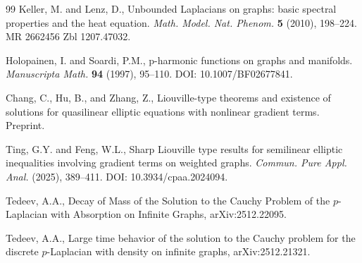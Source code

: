 \documentclass{article}
\begin{document}
\begin{thebibliography}{99}
		 Keller, M. and Lenz, D., Unbounded Laplacians on graphs: basic spectral properties and the heat equation. \textit{Math. Model. Nat. Phenom.} \textbf{5} (2010), 198--224. MR 2662456 Zbl 1207.47032.
		
		 Holopainen, I. and Soardi, P.M., p-harmonic functions on graphs and manifolds. \textit{Manuscripta Math.} \textbf{94} (1997), 95--110. DOI: 10.1007/BF02677841.
		
		 Chang, C., Hu, B., and Zhang, Z., Liouville-type theorems and existence of solutions for quasilinear elliptic equations with nonlinear gradient terms. Preprint.
		
		 Ting, G.Y. and Feng, W.L., Sharp Liouville type results for semilinear elliptic inequalities involving gradient terms on weighted graphs. \textit{Commun. Pure Appl. Anal.} (2025), 389--411. DOI: 10.3934/cpaa.2024094.
		
		Tedeev, A.A., Decay of Mass of the Solution to the Cauchy Problem of the $p$-Laplacian with Absorption on Infinite Graphs, arXiv:2512.22095.
		
		Tedeev, A.A., Large time behavior of the solution to the Cauchy problem for the discrete $p$-Laplacian with density on infinite graphs, arXiv:2512.21321.
		
	\end{thebibliography}
	
	\bigskip
	
\end{document}
